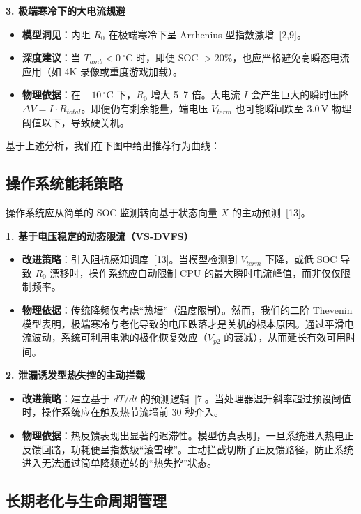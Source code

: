 \documentclass[11pt,a4paper]{ctexart}
\newcommand{\degC}{\ensuremath{^{\circ}\mathrm{C}}}
\begin{document}
\textbf{3. 极端寒冷下的大电流规避}

\begin{itemize}
\item \textbf{模型洞见}：内阻 $R_0$ 在极端寒冷下呈 Arrhenius 型指数激增~[2,9]。
\item \textbf{深度建议}：当 $T_{amb}<0\,\degC$ 时，即便 SOC $>20\%$，也应严格避免高瞬态电流应用（如 4K 录像或重度游戏加载）。
\item \textbf{物理依据}：在 $-10\,\degC$ 下，$R_0$ 增大 5--7 倍。大电流 $I$ 会产生巨大的瞬时压降 $\Delta V=I\cdot R_{total}$。即便仍有剩余能量，端电压 $V_{term}$ 也可能瞬间跌至 3.0\,V 物理阈值以下，导致硬关机。
\end{itemize}

基于上述分析，我们在下图中给出推荐行为曲线：

\subsection{操作系统能耗策略}

操作系统应从简单的 SOC 监测转向基于状态向量 $X$ 的主动预测~[13]。

\textbf{1. 基于电压稳定的动态限流（VS-DVFS）}

\begin{itemize}
\item \textbf{改进策略}：引入阻抗感知调度~[13]。当模型检测到 $V_{term}$ 下降，或低 SOC 导致 $R_0$ 漂移时，操作系统应自动限制 CPU 的最大瞬时电流峰值，而非仅仅限制频率。
\item \textbf{物理依据}：传统降频仅考虑“热墙”（温度限制）。然而，我们的二阶 Thevenin 模型表明，极端寒冷与老化导致的电压跌落才是关机的根本原因。通过平滑电流波动，系统可利用电池的极化恢复效应（$V_{p2}$ 的衰减），从而延长有效可用时间。
\end{itemize}

\textbf{2. 泄漏诱发型热失控的主动拦截}

\begin{itemize}
\item \textbf{改进策略}：建立基于 $dT/dt$ 的预测逻辑~[7]。当处理器温升斜率超过预设阈值时，操作系统应在触及热节流墙前 30 秒介入。
\item \textbf{物理依据}：热反馈表现出显著的迟滞性。模型仿真表明，一旦系统进入热电正反馈回路，功耗便呈指数级“滚雪球”。主动拦截切断了正反馈路径，防止系统进入无法通过简单降频逆转的“热失控”状态。
\end{itemize}

\subsection{长期老化与生命周期管理}
\end{document}
